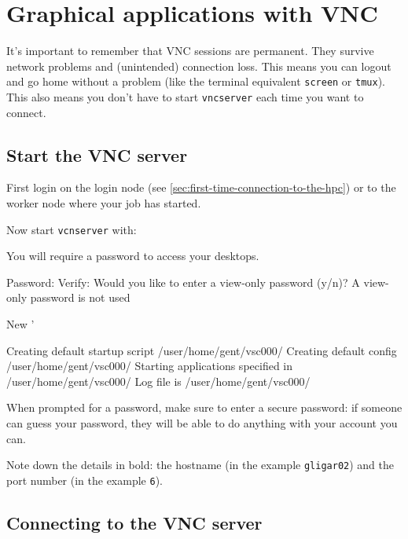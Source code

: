 \chapter{Graphical applications with VNC}
\label{ch:vnc}

It's important to remember that VNC sessions are permanent. They survive network
problems and (unintended) connection loss. This means you can logout and go home
without a problem (like the terminal equivalent \lstinline|screen| or \lstinline|tmux|).
This also means you don't have to start \lstinline|vncserver| each time you want to connect.

\section{Start the VNC server}
\label{sec:start-vnc}

First login on the login node (see \autoref{sec:first-time-connection-to-the-hpc})
or to the worker node where your job has started. %

Now start \lstinline|vcnserver| with:

\begin{prompt}
You will require a password to access your desktops.

Password:%
Verify:%
Would you like to enter a view-only password (y/n)? %
A view-only password is not used

New '%

Creating default startup script /user/home/gent/vsc000/%
Creating default config /user/home/gent/vsc000/%
Starting applications specified in /user/home/gent/vsc000/%
Log file is /user/home/gent/vsc000/%

\end{prompt}

When prompted for a password, make sure to enter a secure password: if someone
can guess your password, they will be able to do anything with your account you can.

Note down the details in bold: the hostname (in the example \lstinline|gligar02|)
and the port number (in the example \lstinline|6|).

\section{Connecting to the VNC server}

